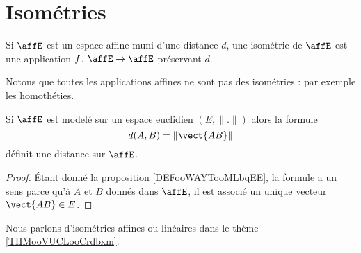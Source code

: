 \section{Isométries}

\begin{definition}       \label{DEFooZGKBooGgjkgs}
     Si \( \affE\) est un espace affine muni d'une distance \( d\), une isométrie de \( \affE\) est une application \( f\colon \affE\to \affE\) préservant \( d\).
\end{definition}
Notons que toutes les applications affines ne sont pas des isométries : par exemple les homothéties.

\begin{proposition}     \label{PROPooHSOGooBbFTYt}
    Si \( \affE\) est modelé sur un espace euclidien \( (E,\| . \|)\) alors la formule
    \begin{equation}
        d(A,B)=\| \vect{ AB } \|
    \end{equation}
    définit une distance sur \( \affE\).
\end{proposition}

\begin{proof}
    Étant donné la proposition \ref{DEFooWAYTooMLbqEE}, la formule a un sens parce qu'à \( A\) et \( B\) donnés dans \( \affE\), il est associé un unique vecteur \( \vect{ AB }\in E\).
\end{proof}

Nous parlons d'isométries affines ou linéaires dans le thème \ref{THMooVUCLooCrdbxm}.

